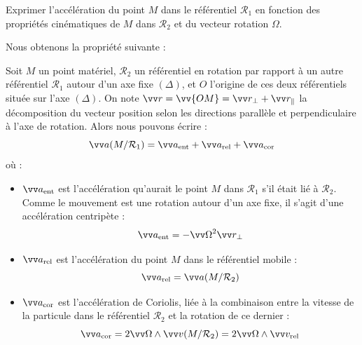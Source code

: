 \documentclass[11pt,fleqn]{book} %
\newcommand{\rref}{\mathcal{R}}
\begin{document}
\begin{capex}
	Exprimer l'accélération du point $M$ dans le référentiel $\rref_1$ en fonction des propriétés cinématiques de $M$ dans $\rref_2$ et du vecteur rotation $\Omega$.
\end{capex}

Nous obtenons la propriété suivante :
\begin{proposition}
	Soit $M$ un point matériel, $\rref_2$ un référentiel en rotation par rapport à un autre référentiel $\rref_1$ autour d'un axe fixe $(\Delta)$, et $O$ l'origine de ces deux référentiels située sur l'axe $(\Delta)$. On note $\vv r = \vv{OM} = \vv r_\perp + \vv r_\parallel$ la décomposition du vecteur position selon les directions parallèle et perpendiculaire à l'axe de rotation. Alors nous pouvons écrire :
	\begin{equation}
		\vv a(M/\rref_1) = \vv a_{\rm ent} + \vv a_{\rm rel} + \vv a_{\rm cor}
	\end{equation}
	où :
	\begin{itemize}
		\item $\vv a_{\rm ent}$ est l'accélération qu'aurait le point $M$ dans $\rref_1$ s'il était lié à $\rref_2$. Comme le mouvement est une rotation autour d'un axe fixe, il s'agit d'une accélération centripète :
			\begin{equation}
				\vv a_{\rm ent} = - {\vv \Omega}^2 \vv r_{\perp}
			\end{equation}
		\item $\vv a_{\rm rel}$ est l'accélération du point $M$ dans le référentiel mobile :
			\begin{equation}
				\vv a_{\rm rel} = \vv a(M/\rref_2)
			\end{equation}
		\item $\vv a_{\rm cor}$ est l'accélération de Coriolis, liée à la combinaison entre la vitesse de la particule dans le référentiel $\rref_2$ et la rotation de ce dernier :
			\begin{equation}
				\vv a_{\rm cor} = 2 \vv \Omega \wedge \vv v(M/\rref_2) = 2 \vv \Omega \wedge \vv v_{\rm rel}
			\end{equation}
	\end{itemize}
\end{proposition}
\end{document}
